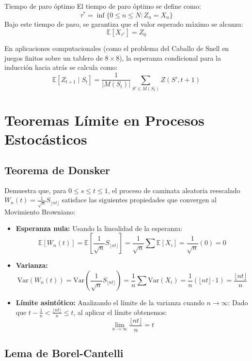 \documentclass[10pt,a4paper]{article}
\begin{document}
\begin{alerta}{Tiempo de paro óptimo}
El tiempo de paro óptimo se define como:
\[ \tau^* = \inf\{ 0 \le n \le N : Z_n = X_n \} \]
Bajo este tiempo de paro, se garantiza que el valor esperado máximo se alcanza:
\[ \mathbb{E}[X_{\tau^*}] = Z_0 \]
\end{alerta}

En aplicaciones computacionales (como el problema del Caballo de Snell en juegos finitos sobre un tablero de $8 \times 8$), la esperanza condicional para la inducción hacia atrás se calcula como:
\[ \mathbb{E}[Z_{t+1} \mid S_t] = \frac{1}{|M(S_t)|} \sum_{S' \in M(S_t)} Z(S', t+1) \]


\section{Teoremas Límite en Procesos Estocásticos}

\subsection{Teorema de Donsker}
Demuestra que, para $0 \le s \le t \le 1$, el proceso de caminata aleatoria reescalado $W_n(t) = \frac{1}{\sqrt{n}} S_{\lfloor nt \rfloor}$ satisface las siguientes propiedades que convergen al Movimiento Browniano:

\begin{itemize}
    \item \textbf{Esperanza nula:} Usando la linealidad de la esperanza:
    \[ \mathbb{E}[W_n(t)] = \mathbb{E}\left[ \frac{1}{\sqrt{n}} S_{\lfloor nt \rfloor} \right] = \frac{1}{\sqrt{n}} \sum \mathbb{E}[X_i] = \frac{1}{\sqrt{n}}(0) = 0 \]
    
    \item \textbf{Varianza:}
    \[ \text{Var}(W_n(t)) = \text{Var}\left( \frac{1}{\sqrt{n}} S_{\lfloor nt \rfloor} \right) = \frac{1}{n} \sum \text{Var}(X_i) = \frac{1}{n}(\lfloor nt \rfloor \cdot 1) = \frac{\lfloor nt \rfloor}{n} \]
    
    \item \textbf{Límite asintótico:} Analizando el límite de la varianza cuando $n \to \infty$:
    Dado que $t - \frac{1}{n} < \frac{\lfloor nt \rfloor}{n} \le t$, al aplicar el límite obtenemos:
    \[ \lim_{n \to \infty} \frac{\lfloor nt \rfloor}{n} = t \]
\end{itemize}

\subsection{Lema de Borel-Cantelli}
\end{document}

